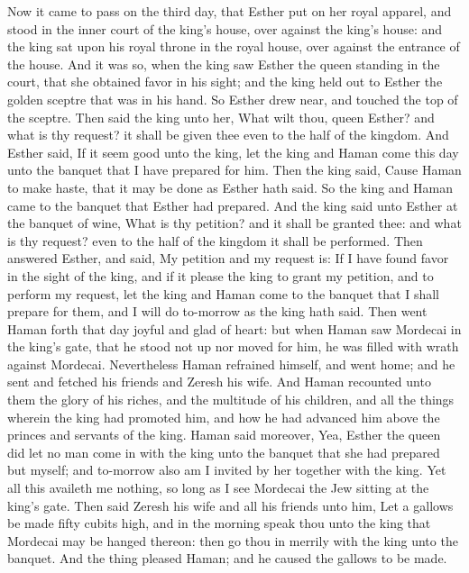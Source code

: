 Now it came to pass on the third day, that Esther put on her royal apparel, and stood in the inner court of the king’s house, over against the king’s house: and the king sat upon his royal throne in the royal house, over against the entrance of the house. And it was so, when the king saw Esther the queen standing in the court, that she obtained favor in his sight; and the king held out to Esther the golden sceptre that was in his hand. So Esther drew near, and touched the top of the sceptre. Then said the king unto her, What wilt thou, queen Esther? and what is thy request? it shall be given thee even to the half of the kingdom. And Esther said, If it seem good unto the king, let the king and Haman come this day unto the banquet that I have prepared for him.  Then the king said, Cause Haman to make haste, that it may be done as Esther hath said. So the king and Haman came to the banquet that Esther had prepared. And the king said unto Esther at the banquet of wine, What is thy petition? and it shall be granted thee: and what is thy request? even to the half of the kingdom it shall be performed. Then answered Esther, and said, My petition and my request is: If I have found favor in the sight of the king, and if it please the king to grant my petition, and to perform my request, let the king and Haman come to the banquet that I shall prepare for them, and I will do to-morrow as the king hath said.  Then went Haman forth that day joyful and glad of heart: but when Haman saw Mordecai in the king’s gate, that he stood not up nor moved for him, he was filled with wrath against Mordecai. Nevertheless Haman refrained himself, and went home; and he sent and fetched his friends and Zeresh his wife. And Haman recounted unto them the glory of his riches, and the multitude of his children, and all the things wherein the king had promoted him, and how he had advanced him above the princes and servants of the king. Haman said moreover, Yea, Esther the queen did let no man come in with the king unto the banquet that she had prepared but myself; and to-morrow also am I invited by her together with the king. Yet all this availeth me nothing, so long as I see Mordecai the Jew sitting at the king’s gate. Then said Zeresh his wife and all his friends unto him, Let a gallows be made fifty cubits high, and in the morning speak thou unto the king that Mordecai may be hanged thereon: then go thou in merrily with the king unto the banquet. And the thing pleased Haman; and he caused the gallows to be made. 

